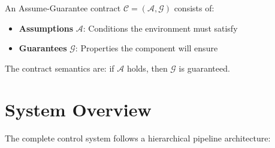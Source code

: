 \begin{definition}
An Assume-Guarantee contract $\mathcal{C} = (\mathcal{A}, \mathcal{G})$ consists of:
\begin{itemize}
    \item \textbf{Assumptions} $\mathcal{A}$: Conditions the environment must satisfy
    \item \textbf{Guarantees} $\mathcal{G}$: Properties the component will ensure
\end{itemize}
The contract semantics are: if $\mathcal{A}$ holds, then $\mathcal{G}$ is guaranteed.
\end{definition}


\section{System Overview}

The complete control system follows a hierarchical pipeline architecture:

